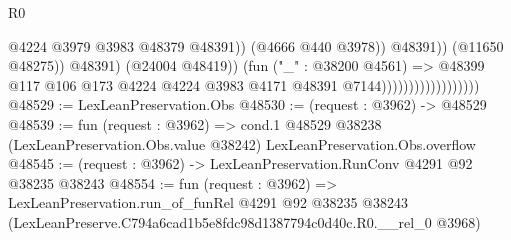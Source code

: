 \begin{lexlean}{R0}
\begin{coremodule}
                                                      @4224
                                                      @3979
                                                      @3983
                                                      @48379
                                                      @48391))
                                                  (@4666 @440 @3978))
                                                @48391))
                                            (@11650 @48275))
                                          @48391)
                                        (@24004 @48419))
                                      (fun ("_" : @38200 @4561) =>
                                      @48399
                                        @117
                                        @106
                                        @173
                                        @4224
                                        @4224
                                        @3983
                                        @4171
                                        @48391
                                        @7144))))))))))))))))))
@48529 := LexLeanPreservation.Obs
@48530 := (request : @3962) -> @48529
@48539 := fun (request : @3962) =>
  cond.{1} @48529 @38238 (LexLeanPreservation.Obs.value @38242) LexLeanPreservation.Obs.overflow
@48545 := (request : @3962) -> LexLeanPreservation.RunConv @4291 @92 @38235 @38243
@48554 := fun (request : @3962) =>
  LexLeanPreservation.run_of_funRel
    @4291
    @92
    @38235
    @38243
    (LexLeanPreserve.C794a6cad1b5e8fdc98d1387794c0d40c.R0.__rel_0 @3968)
\end{coremodule}
\end{lexlean}
